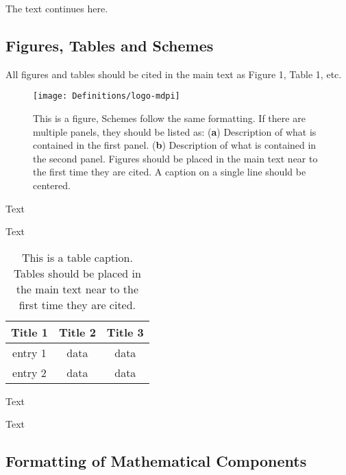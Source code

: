 \documentclass[journal,article,submit,moreauthors,pdftex,water]{Definitions/mdpi}
\begin{document}
The text continues here.

\subsection{Figures, Tables and Schemes}

All figures and tables should be cited in the main text as Figure 1, Table 1, etc.

\begin{figure}[H]
\centering
\texttt{[image: Definitions/logo-mdpi]}
\caption{This is a figure, Schemes follow the same formatting. If there are multiple panels, they should be listed as: (\textbf{a}) Description of what is contained in the first panel. (\textbf{b}) Description of what is contained in the second panel. Figures should be placed in the main text near to the first time they are cited. A caption on a single line should be centered.}
\end{figure}   
 
Text

Text

\begin{table}[H]
\caption{This is a table caption. Tables should be placed in the main text near to the first time they are cited.}
\centering
\begin{tabular}{ccc}
\toprule
\textbf{Title 1}	& \textbf{Title 2}	& \textbf{Title 3}\\
\midrule
entry 1		& data			& data\\
entry 2		& data			& data\\
\bottomrule
\end{tabular}
\end{table}

Text

Text



\subsection{Formatting of Mathematical Components}
\end{document}
